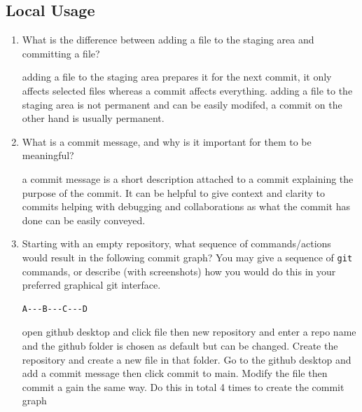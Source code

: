 \documentclass[10pt,twocolumn]{article}
\begin{document}
\subsection{Local Usage}

\begin{enumerate}
\item What is the difference between adding a file to the staging area and committing a file?

\medskip
adding a file to the staging area prepares it for the next commit, it only affects selected files whereas a commit affects everything. adding a file to the staging area is not permanent and can be easily modifed, a commit on the other hand is usually permanent.
\medskip

\item What is a commit message, and why is it important for them to be meaningful?

\medskip
a commit message is  a short description attached to a commit explaining the purpose of the commit. It can be helpful to give context and clarity to commits helping with debugging and collaborations as what the commit has done can be easily conveyed.
\medskip

\item Starting with an empty repository, what sequence of commands/actions would result in the following commit graph? You may give a sequence of \texttt{git} commands, or describe (with screenshots) how you would do this in your preferred graphical git interface.
\begin{verbatim}
A---B---C---D
\end{verbatim}

\medskip
open github desktop and click file then new repository and enter a repo name and the github folder is chosen as default but can be changed. Create the repository and create a new file in that folder. Go to the github desktop and add a commit message then click commit to main. Modify the file then commit a gain the same way. Do this in total 4 times to create the commit graph


\end{enumerate}
\end{document}
